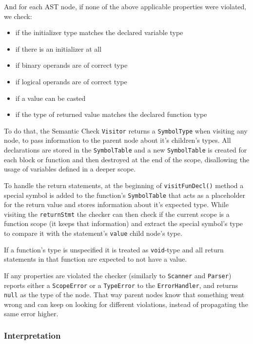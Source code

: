 \documentclass[a4paper,12pt]{article}
\providecommand{\tightlist}{\setlength{\itemsep}{0pt}\setlength{\parskip}{0pt}}
\begin{document}
And for each AST node, if none of the above applicable properties were
violated, we check:

\begin{itemize}
\tightlist
\item
  if the initializer type matches the declared variable type
\item
  if there is an initializer at all
\item
  if binary operands are of correct type
\item
  if logical operands are of correct type
\item
  if a value can be casted
\item
  if the type of returned value matches the declared function type
\end{itemize}

To do that, the Semantic Check \texttt{Visitor} returns a
\texttt{SymbolType} when visiting any node, to pass information to the
parent node about it's children's types. All declarations are stored in
the \texttt{SymbolTable} and a new \texttt{SymbolTable} is created for
each block or function and then destroyed at the end of the scope,
disallowing the usage of variables defined in a deeper scope. \newline

To handle the return statements, at the beginning of
\texttt{visitFunDecl()} method a special symbol is added to the
function's \texttt{SymbolTable} that acts as a placeholder for the
return value and stores information about it's expected type. While
visiting the \texttt{returnStmt} the checker can then check if the
current scope is a function scope (it keeps that information) and
extract the special symbol's type to compare it with the statement's
\texttt{value} child node's type. \newline

If a function's type is unspecified it is treated as \texttt{void}-type
and all return statements in that function are expected to not have a
value. \newline

If any properties are violated the checker (similarly to
\texttt{Scanner} and \texttt{Parser}) reports either a
\texttt{ScopeError} or a \texttt{TypeError} to the
\texttt{ErrorHandler}, and returns \texttt{null} as the type of the
node. That way parent nodes know that something went wrong and can keep
on looking for different violations, instead of propagating the same
error higher.

\subsubsection{Interpretation}\label{interpretation}
\end{document}
